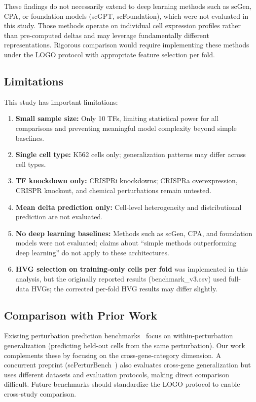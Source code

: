 \documentclass[12pt,number,sort&compress]{elsarticle}
\begin{document}
These findings do not necessarily extend to deep learning methods such as
scGen, CPA, or foundation models (scGPT, scFoundation), which were not
evaluated in this study. Those methods operate on individual cell
expression profiles rather than pre-computed deltas and may leverage
fundamentally different representations. Rigorous comparison would require
implementing these methods under the LOGO protocol with appropriate
feature selection per fold.

\subsection{Limitations}
\label{sec:limitations}

This study has important limitations:

\begin{enumerate}
  \item \textbf{Small sample size:} Only 10 TFs, limiting statistical power
        for all comparisons and preventing meaningful model complexity beyond
        simple baselines.
  \item \textbf{Single cell type:} K562 cells only; generalization patterns
        may differ across cell types.
  \item \textbf{TF knockdown only:} CRISPRi knockdowns; CRISPRa overexpression,
        CRISPR knockout, and chemical perturbations remain untested.
  \item \textbf{Mean delta prediction only:} Cell-level heterogeneity and
        distributional prediction are not evaluated.
  \item \textbf{No deep learning baselines:} Methods such as scGen, CPA, and
        foundation models were not evaluated; claims about ``simple methods
        outperforming deep learning'' do not apply to these architectures.
  \item \textbf{HVG selection on training-only cells per fold} was implemented
        in this analysis, but the originally reported results (benchmark\_v3.csv)
        used full-data HVGs; the corrected per-fold HVG results may differ
        slightly.
\end{enumerate}

\subsection{Comparison with Prior Work}
\label{sec:prior_work}

Existing perturbation prediction benchmarks~\citep{Allen2022Benchmark,Crowell2023}
focus on within-perturbation generalization (predicting held-out cells from
the same perturbation). Our work complements these by focusing on the
cross-gene-category dimension. A concurrent preprint
(scPerturBench~\citep{scPerturBench2024}) also evaluates cross-gene
generalization but uses different datasets and evaluation protocols,
making direct comparison difficult. Future benchmarks should standardize
the LOGO protocol to enable cross-study comparison.
\end{document}

